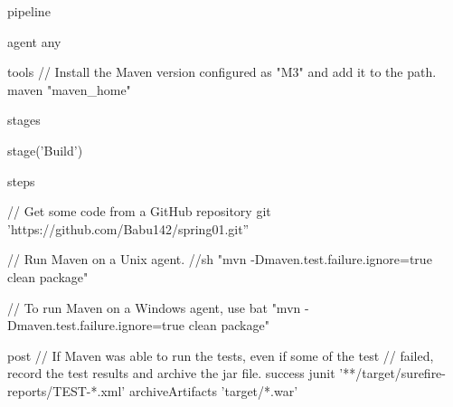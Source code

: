 pipeline {
    agent any

    tools {
        // Install the Maven version configured as "M3" and add it to the path.
        maven "maven_home"
    }

    stages {
        stage('Build') {
            steps {
                // Get some code from a GitHub repository
                git 'https://github.com/Babu142/spring01.git''

                // Run Maven on a Unix agent.
                //sh "mvn -Dmaven.test.failure.ignore=true clean package"

                // To run Maven on a Windows agent, use
                 bat "mvn -Dmaven.test.failure.ignore=true clean package"
            }

            post {
                // If Maven was able to run the tests, even if some of the test
                // failed, record the test results and archive the jar file.
                success {
                    junit '**/target/surefire-reports/TEST-*.xml'
                    archiveArtifacts 'target/*.war'
                }
            }
        }
    }
}
